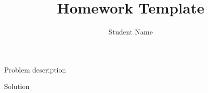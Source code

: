 \documentclass{homework}
\title{Homework Template}
\author{Student Name}
\begin{document}
\maketitle

\begin{prob}
  Problem description
\end{prob}
\begin{sol}
  Solution
\end{sol}
\end{document}
